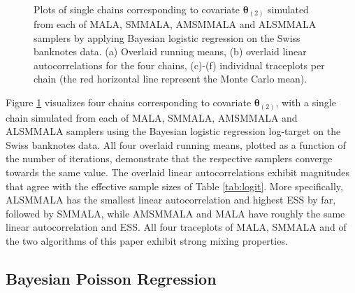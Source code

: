 \documentclass[twoside,11pt]{article}
\begin{document}
\begin{figure}[t]
	 \\
	\caption{
		Plots of single chains corresponding to covariate $\boldsymbol{\theta}_{(2)}$ simulated from each of MALA, SMMALA, 
		AMSMMALA and ALSMMALA samplers by applying Bayesian logistic regression on the Swiss banknotes data. (a) Overlaid 
		running means, (b) overlaid linear autocorrelations for the four chains, (c)-(f) individual traceplots per chain (the 
		red horizontal line represent the Monte Carlo mean).
	}
	\label{fig:logit}
\end{figure}

Figure \ref{fig:logit} visualizes four chains corresponding to covariate $\boldsymbol{\theta}_{(2)}$, with a single chain 
simulated from each of MALA, SMMALA, AMSMMALA and ALSMMALA samplers using the Bayesian logistic regression log-target on the 
Swiss banknotes data. All four overlaid running means, plotted as a function of the number of iterations, demonstrate that 
the respective samplers converge towards the same value. The overlaid linear autocorrelations exhibit magnitudes that agree 
with the effective sample sizes of Table \ref{tab:logit}. More specifically, ALSMMALA has the smallest linear 
autocorrelation and highest ESS by far, followed by SMMALA, while AMSMMALA and MALA have roughly the same linear 
autocorrelation and ESS. All four traceplots of MALA, SMMALA and of the two algorithms of this paper exhibit strong mixing 
properties.

\subsection{Bayesian Poisson Regression}
\end{document}
